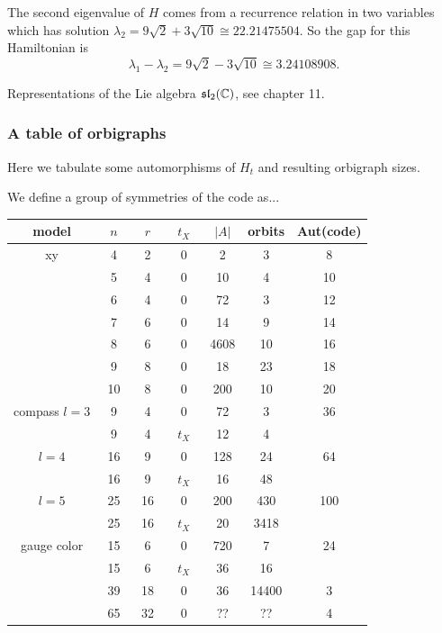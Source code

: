 \documentclass[12pt]{article}
\begin{document}
The second eigenvalue of $H$ comes from a recurrence
relation in two variables which has solution
$\lambda_2 = 9\sqrt{2} + 3\sqrt{10} \cong 22.21475504.$
So the gap for this Hamiltonian  is 
$$\lambda_1 - \lambda_2 = 9\sqrt{2} - 3\sqrt{10} \cong 3.24108908.$$

Representations of the Lie algebra $\mathfrak{sl}_2(\mathbb{C})$, see
\cite{Fulton2013} chapter 11.


%
\subsubsection{A table of orbigraphs}

Here we tabulate some automorphisms of $H_t$
and resulting orbigraph sizes.

We define a group of symmetries of the code as...

\begin{center}
\begin{tabular}{ c|c|c|c|c|c|c } 
model &\ $n$\ &\ $r$\ &\ $t_X$\ & $|A|$ & orbits & Aut(code) \\
\hline
    xy & 4 &  2& 0 & 2 & 3 & 8 \\
       & 5 &  4& 0 & 10 & 4 & 10 \\
       & 6 &  4& 0 & 72 & 3 & 12 \\
       & 7 &  6& 0 & 14 & 9 & 14 \\
       & 8 &  6& 0 & 4608 & 10 & 16 \\
       & 9 &  8& 0 & 18 & 23 & 18  \\
       & 10 & 8& 0 & 200 & 10 & 20  \\
\hline
    compass $l=3$ & 9 & 4 & 0 & 72 & 3 & 36 \\
                  & 9 & 4 & $t_X$ & 12 & 4 &  \\
            $l=4$  & 16 & 9  & 0 & 128 & 24 & 64 \\
                   & 16 & 9  & $t_X$ & 16 & 48 &  \\
            $l=5$  & 25 & 16 & 0 & 200 & 430 & 100 \\
                   & 25 & 16 & $t_X$ & 20  & 3418 &  \\
\hline
    gauge color & 15 & 6  & 0 & 720 & 7 & 24  \\
                & 15 & 6  & $t_X$ & 36 & 16 &  \\
                & 39 & 18 & 0 & 36 & 14400 & 3  \\
                & 65 & 32 & 0 & ?? & ?? & 4 \\
\end{tabular}
\end{center}
\end{document}

